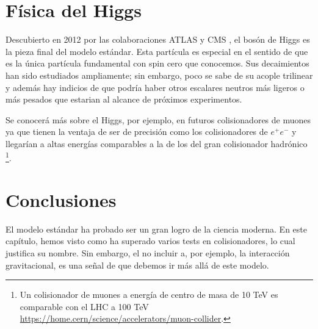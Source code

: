 \section[\hspace{-0.19in} Física del Higgs]{Física del Higgs}



Descubierto en 2012 por las colaboraciones ATLAS \cite{ATLAS:2012yve} y CMS \cite{CMS:2012qbp}, el bosón de Higgs es la pieza final del modelo estándar. Esta partícula es especial en el sentido de que es la única partícula fundamental con spin cero que conocemos. Sus decaimientos han sido estudiados ampliamente; sin embargo, poco se sabe de su acople trilinear y además hay indicios de que podría haber otros escalares neutros más ligeros \cite{CMS:2018cyk,CMS:2023yay,CMS:2024yhz} o más pesados \cite{Kundu:2024sip} que estarian al alcance de próximos experimentos.

Se conocerá más sobre el Higgs, por ejemplo, en futuros colisionadores de muones ya que tienen la ventaja de ser de precisión como los colisionadores de $e^+e^-$ y llegarían a altas energías comparables a la de los del gran colisionador hadrónico \footnote{Un colisionador de muones a energía de centro de masa de 10 TeV es comparable con el LHC a 100 TeV \url{https://home.cern/science/accelerators/muon-collider}.}.


\section[\hspace{-0.2in} Conclusiones]{Conclusiones}

El modelo estándar ha probado ser un gran logro de la ciencia moderna. En este capítulo, hemos visto como ha superado varios tests en colisionadores, lo cual justifica su nombre. Sin embargo, el no incluir a, por ejemplo, la interacción gravitacional, es una señal de que debemos ir más allá de este modelo.














